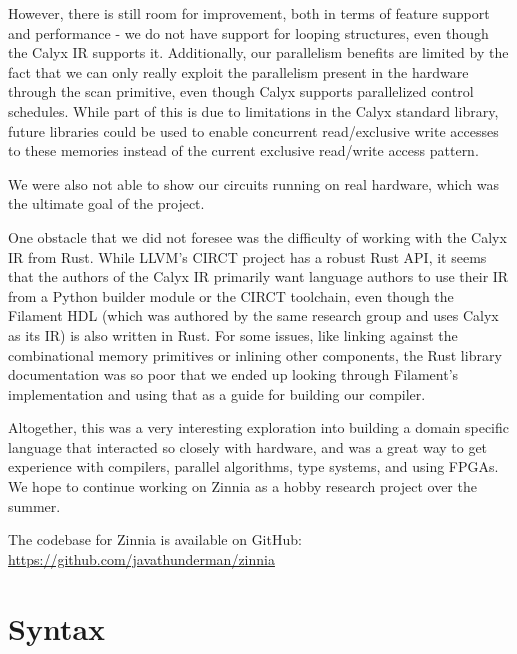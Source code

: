 \documentclass[12pt]{article}
\begin{document}
However, there is still room for improvement, both in terms of feature support and performance - we do not have support for looping structures,
even though the Calyx IR supports it. Additionally, our parallelism benefits are limited by the fact that we can only really exploit
the parallelism present in the hardware through the scan primitive, even though Calyx supports parallelized control schedules. While part of this
is due to limitations in the Calyx standard library, future libraries could be used to enable concurrent read/exclusive write
accesses to these memories instead of the current exclusive read/write access pattern.

We were also not able to show our circuits running on real hardware, which was the ultimate goal of the project.

One obstacle that we did not foresee was the difficulty of working with the Calyx IR from Rust. While LLVM's CIRCT project
has a robust Rust API, it seems that the authors of the Calyx IR primarily want language authors to use their IR from
a Python builder module or the CIRCT toolchain, even though the Filament HDL (which was authored by the same research
group and uses Calyx as its IR) is also written in Rust. For some issues, like linking against the combinational memory
primitives or inlining other components, the Rust library documentation was so poor that we ended up looking through
Filament's implementation and using that as a guide for building our compiler.

Altogether, this was a very interesting exploration into building a domain specific language that interacted so closely
with hardware, and was a great way to get experience with compilers, parallel algorithms, type systems, and using FPGAs.
We hope to continue working on Zinnia as a hobby research project over the summer.

The codebase for Zinnia is available on GitHub: \url{https://github.com/javathunderman/zinnia}

\section{Syntax}
\setlength{\grammarparsep}{20pt plus 1pt minus 1pt}
\setlength{\grammarindent}{12em}
\end{document}
